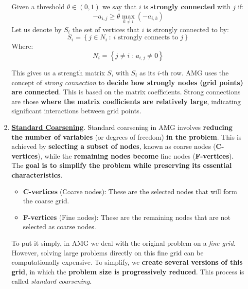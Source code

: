 \begin{enumerate}
    \begin{definitionbox}
        Given a threshold $\theta \in \left(0, 1\right)$ we say that $i$ is \textbf{strongly connected} with $j$ if:
        \begin{equation}
            -a_{i,j} \ge \theta \underset{k \ne i}{\max}\left(-a_{i,k}\right)
        \end{equation}
        Let us denote by $S_{i}$ the set of vertices that $i$ is strongly connected to by:
        \begin{equation}
            S_{i} = \left\{j \in N_{i} \: : \: i \text{ strongly connects to } j\right\}
        \end{equation}
        Where:
        \begin{equation*}
            N_{i} = \left\{j \ne i \: : \: a_{i,j} \ne 0\right\}
        \end{equation*}
    \end{definitionbox}
    
    \noindent
    This gives us a strength matrix $S$, with $S_{i}$ as its $i$-th row. AMG uses the concept of \emph{strong connection} to \textbf{decide how strongly nodes (grid points) are connected}. This is based on the matrix coefficients. Strong connections are those \textbf{where the matrix coefficients are relatively large}, indicating significant interactions between grid points.


    \item \textbf{\underline{Standard Coarsening}}. Standard coarsening in AMG involves \textbf{reducing the number of variables} (or degrees of freedom) \textbf{in the problem}. This is achieved by \textbf{selecting a subset of nodes}, known as coarse nodes (\textbf{C-vertices}), while the \textbf{remaining nodes become} fine nodes (\textbf{F-vertices}). The \textbf{goal is to simplify the problem while preserving its essential characteristics}.
    
    \begin{itemize}
    	\item \textbf{C-vertices} (Coarse nodes): These are the selected nodes that will form the coarse grid.
    	
    	\item \textbf{F-vertices} (Fine nodes): These are the remaining nodes that are not selected as coarse nodes.
    \end{itemize}
    To put it simply, in AMG we deal with the original problem on a \emph{fine grid}. However, solving large problems directly on this fine grid can be computationally expensive. To simplify, we \textbf{create several  versions of this grid}, in which the \textbf{problem size is progressively reduced}. This process is called \emph{standard coarsening}.
    

\end{enumerate}

